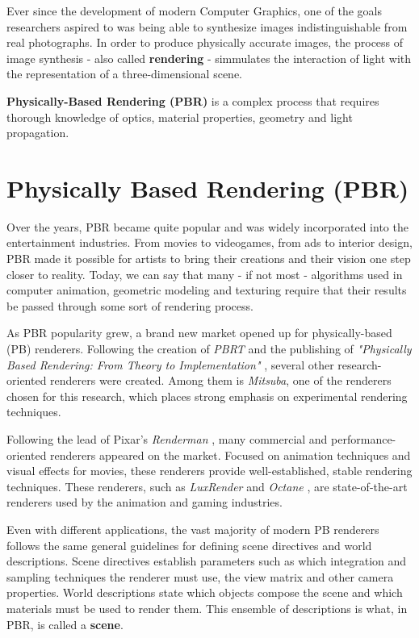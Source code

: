 \documentclass[cic,tc,english]{iiufrgs}
\begin{document}
Ever since the development of modern Computer Graphics, one of the goals researchers aspired to was being able to synthesize images indistinguishable from real photographs. In order to produce physically accurate images, the process of image synthesis - also called \textbf{rendering} - simmulates the interaction of light with the representation of a three-dimensional scene. 

\textbf{Physically-Based Rendering (PBR)} is a complex process that requires thorough knowledge of optics, material properties, geometry and light propagation.

\section{Physically Based Rendering (PBR)}
Over the years, PBR became quite popular and was widely incorporated into the entertainment industries. From movies to videogames, from ads to interior design, PBR made it possible for artists to bring their creations and their vision one step closer to reality. Today, we can say that many - if not most - algorithms used in computer animation, geometric modeling and texturing require that their results be passed through some sort of rendering process.

As PBR popularity grew, a brand new market opened up for physically-based (PB) renderers. Following the creation of \textit{PBRT} and the publishing of \textit{"Physically Based Rendering: From Theory to Implementation"} \cite{pbrt}, several other research-oriented renderers were created. Among them is \textit{Mitsuba}, one of the renderers chosen for this research, which places strong emphasis on experimental rendering techniques.

Following the lead of Pixar's \textit{Renderman} \cite{renderman}, many commercial and performance-oriented renderers appeared on the market. Focused on animation techniques and visual effects for movies, these renderers provide well-established, stable rendering techniques. These renderers, such as \textit{LuxRender} \cite{luxrender} and \textit{Octane} \cite{octane}, are state-of-the-art renderers used by the animation and gaming industries.

Even with different applications, the vast majority of modern PB renderers follows the same general guidelines for defining scene directives and world descriptions. Scene directives establish parameters such as which integration and sampling techniques the renderer must use, the view matrix and other camera properties. World descriptions state which objects compose the scene and which materials must be used to render them. This ensemble of descriptions is what, in PBR, is called a \textbf{scene}.
\end{document}
